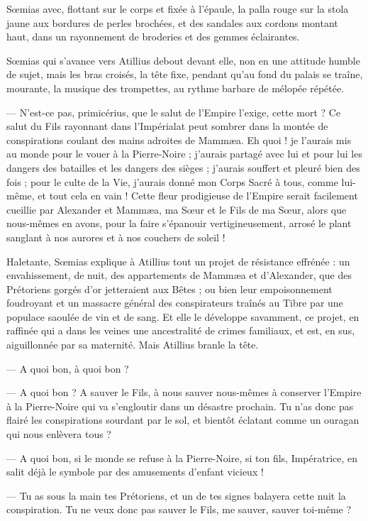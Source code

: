 \documentclass[a4paper, 11pt, oneside, polutonikogreek, french]{article}
\begin{document}
Sœmias avec, flottant sur le corps et fixée à l'épaule, la palla rouge sur la stola jaune aux bordures de perles brochées, et des sandales aux cordons montant haut, dans un rayonnement de broderies et des gemmes éclairantes.

Sœmias qui s'avance vers Atillius debout devant elle, non en une attitude humble de sujet, mais les bras croisés, la tête fixe, pendant qu'au fond du palais se traîne, mourante, la musique des trompettes, au rythme barbare de mélopée répétée.

--- N'est-ce pas, primicérius, que le salut de l'Empire l'exige, cette mort ? Ce salut du Fils rayonnant dans l'Impérialat peut sombrer dans la montée de conspirations coulant des mains adroites de Mammæa. Eh quoi ! je l'aurais mis au monde pour le vouer à la Pierre-Noire ; j'aurais partagé avec lui et pour lui les dangers des batailles et les dangers des sièges ; j'aurais souffert et pleuré bien des fois ; pour le culte de la Vie, j'aurais donné mon Corps Sacré à tous, comme lui-même, et tout cela en vain ! Cette fleur prodigieuse de l'Empire serait facilement cueillie par Alexander et Mammæa, ma Sœur et le Fils de ma Sœur, alors que nous-mêmes en avons, pour la faire s'épanouir vertigineusement, arrosé le plant sanglant à nos aurores et à nos couchers de soleil !

Haletante, Sœmias explique à Atillius tout un projet de résistance effrénée : un envahissement, de nuit, des appartements de Mammæa et d'Alexander, que des Prétoriens gorgés d'or jetteraient aux Bêtes ; ou bien leur empoisonnement foudroyant et un massacre général des conspirateurs traînés au Tibre par une populace saoulée de vin et de sang. Et elle le développe savamment, ce projet, en raffinée qui a dans les veines une ancestralité de crimes familiaux, et est, en sus, aiguillonnée par sa maternité. Mais Atillius branle la tête.

--- A quoi bon, à quoi bon ?

--- A quoi bon ? A sauver le Fils, à nous sauver nous-mêmes à conserver l'Empire à la Pierre-Noire qui va s'engloutir dans un désastre prochain. Tu n'as donc pas flairé les conspirations sourdant par le sol, et bientôt éclatant comme un ouragan qui nous enlèvera tous ?

--- A quoi bon, si le monde se refuse à la Pierre-Noire, si ton fils, Impératrice, en salit déjà le symbole par des amusements d'enfant vicieux !

--- Tu as sous la main tes Prétoriens, et un de tes signes balayera cette nuit la conspiration. Tu ne veux donc pas sauver le Fils, me sauver, sauver toi-même ?
\end{document}
